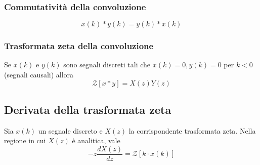 \documentclass[11pt]{article}
\newcommand{\trz}{\mathcal{Z}}
\begin{document}
\subsubsection{Commutatività della convoluzione}
\begin{displaymath}
    x(k)*y(k)=y(k)*x(k)
\end{displaymath}
\subsubsection{Trasformata zeta della convoluzione}
Se $x(k)$ e $y(k)$ sono segnali discreti tali che $x(k)=0, y(k)=0$ per $k<0$ (segnali causali) allora
\begin{displaymath}
    \trz [x*y]=X(z)Y(z)
\end{displaymath}
\subsection{Derivata della trasformata zeta}
Sia $x(k)$ un segnale discreto e $X(z)$ la corrispondente trasformata zeta. Nella regione in cui $X(z)$ è analitica, vale
\begin{displaymath}
    -z\frac{dX(z)}{dz} = \trz [k\cdot x(k)]
\end{displaymath}
\end{document}
